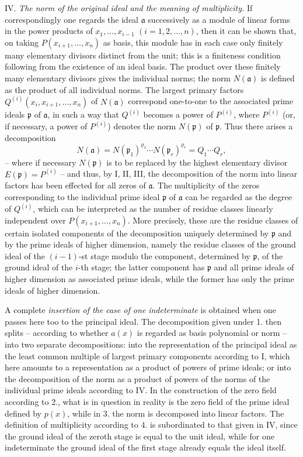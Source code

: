 \documentclass[11pt]{article}
\begin{document}
IV. \emph{The norm of the original ideal and the meaning of multiplicity.} If correspondingly one regards the ideal $\mathfrak a$ successively as a module of linear forms in the power products of $x_1,\ldots,x_{i-1}$ $(i=1,2,\ldots,n)$, then it can be shown that, on taking $P(x_{i+1},\ldots,x_n)$ as basis, this module has in each case only finitely many elementary divisors distinct from the unit; this is a finiteness condition following from the existence of an ideal basis. The product over these finitely many elementary divisors gives the individual norms; the norm $N(\mathfrak a)$ is defined as the product of all individual norms. The largest primary factors $Q^{(i)}(x_i,x_{i+1},\ldots,x_n)$ of $N(\mathfrak a)$ correspond one-to-one to the associated prime ideals $\mathfrak p$ of $\mathfrak a$, in such a way that $Q^{(i)}$ becomes a power of $P^{(i)}$, where $P^{(i)}$ (or, if necessary, a power of $P^{(i)}$) denotes the norm $N(\mathfrak p)$ of $\mathfrak p$. Thus there arises a decomposition
\[
 N(\mathfrak a)=N(\mathfrak p_1)^{\varrho_1}\cdots N(\mathfrak p_r)^{\varrho_r}=Q_1\cdots Q_r,
\]
-- where if necessary $N(\mathfrak p)$ is to be replaced by the highest elementary divisor $E(\mathfrak p)=P^{(i)}$ -- and thus, by I, II, III, the decomposition of the norm into linear factors has been effected for all zeros of $\mathfrak a$. The multiplicity of the zeros corresponding to the individual prime ideal $\mathfrak p$ of $\mathfrak a$ can be regarded as the degree of $Q^{(i)}$, which can be interpreted as the number of residue classes linearly independent over $P(x_{i+1},\ldots,x_n)$. More precisely, these are the residue classes of certain isolated components of the decomposition uniquely determined by $\mathfrak p$ and by the prime ideals of higher dimension, namely the residue classes of the ground ideal of the $(i-1)$-st stage modulo the component, determined by $\mathfrak p$, of the ground ideal of the $i$-th stage; the latter component has $\mathfrak p$ and all prime ideals of higher dimension as associated prime ideals, while the former has only the prime ideals of higher dimension.

A complete \emph{insertion of the case of one indeterminate} is obtained when one passes here too to the principal ideal. The decomposition given under 1. then splits -- according to whether $a(x)$ is regarded as basis polynomial or norm -- into two separate decompositions: into the representation of the principal ideal as the least common multiple of largest primary components according to I, which here amounts to a representation as a product of powers of prime ideals; or into the decomposition of the norm as a product of powers of the norms of the individual prime ideals according to IV. In the construction of the zero field according to 2., what is in question in reality is the zero field of the prime ideal defined by $p(x)$, while in 3. the norm is decomposed into linear factors. The definition of multiplicity according to 4. is subordinated to that given in IV, since the ground ideal of the zeroth stage is equal to the unit ideal, while for one indeterminate the ground ideal of the first stage already equals the ideal itself.
\end{document}
